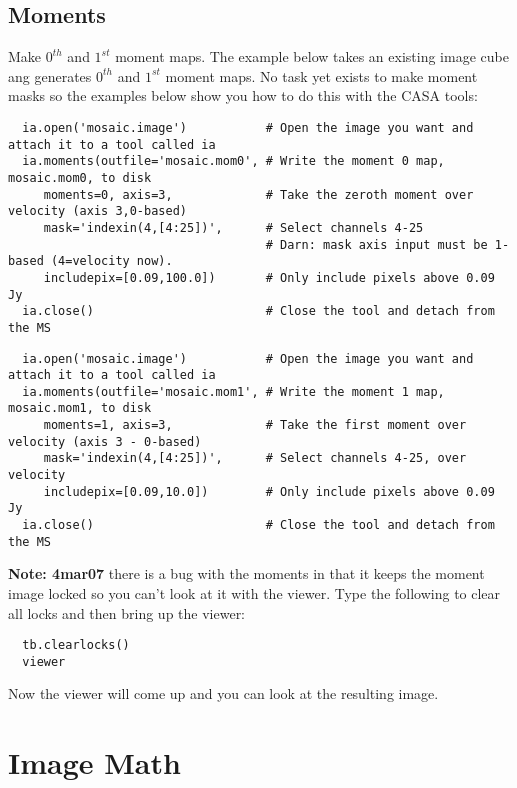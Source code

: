 \subsection{Moments}
\label{section:ia.moments}

Make $0^{th}$ and $1^{st}$ moment maps.  The example below takes an
existing image cube ang generates $0^{th}$ and $1^{st}$ moment maps.
No task yet exists to make moment masks so the examples below show you
how to do this with the CASA tools: 

\small
\begin{verbatim}
  ia.open('mosaic.image')           # Open the image you want and attach it to a tool called ia
  ia.moments(outfile='mosaic.mom0', # Write the moment 0 map, mosaic.mom0, to disk
     moments=0, axis=3,             # Take the zeroth moment over velocity (axis 3,0-based)
     mask='indexin(4,[4:25])',      # Select channels 4-25
                                    # Darn: mask axis input must be 1-based (4=velocity now).  
     includepix=[0.09,100.0])       # Only include pixels above 0.09 Jy
  ia.close()                        # Close the tool and detach from the MS
\end{verbatim}
\normalsize

\small
\begin{verbatim}
  ia.open('mosaic.image')           # Open the image you want and attach it to a tool called ia
  ia.moments(outfile='mosaic.mom1', # Write the moment 1 map, mosaic.mom1, to disk
     moments=1, axis=3,             # Take the first moment over velocity (axis 3 - 0-based)
     mask='indexin(4,[4:25])',      # Select channels 4-25, over velocity
     includepix=[0.09,10.0])        # Only include pixels above 0.09 Jy
  ia.close()                        # Close the tool and detach from the MS
\end{verbatim}
\normalsize

{\bf Note: 4mar07} there is a bug with the moments in that it keeps
the moment image locked so you can't look at it with the viewer.
Type the following to clear all locks and then bring up the viewer: 
\small
\begin{verbatim}
  tb.clearlocks()
  viewer
\end{verbatim}
\normalsize
Now the viewer will come up and you can look at the resulting image.  


\section{Image Math}
\label{section:ia.math}

